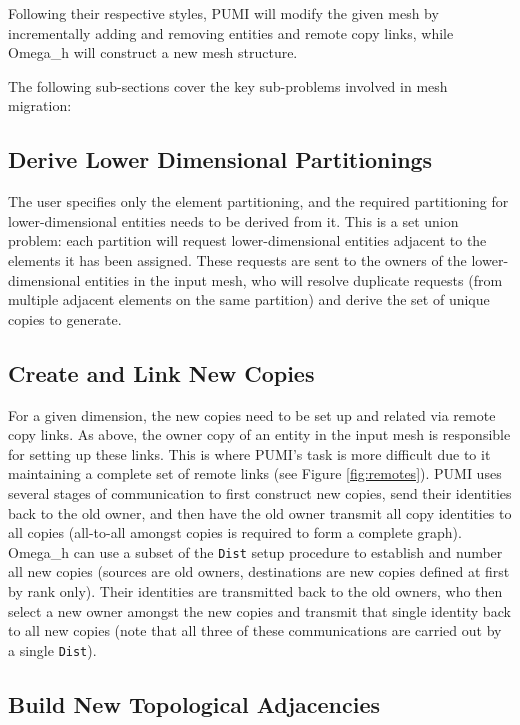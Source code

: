 Following their respective styles, PUMI will modify the given
mesh by incrementally adding and removing entities and remote
copy links,
while Omega\_h will construct a new mesh structure.

The following sub-sections cover the key sub-problems involved
in mesh migration:

\subsection{Derive Lower Dimensional Partitionings}
\label{sec:migr_down}

The user specifies only the element partitioning, and
the required partitioning for lower-dimensional entities needs to
be derived from it.
This is a set union problem: each partition will request lower-dimensional
entities adjacent to the elements it has been assigned.
These requests are sent to the owners of the lower-dimensional entities
in the input mesh, who will resolve duplicate requests (from multiple
adjacent elements on the same partition) and derive the set
of unique copies to generate.

\subsection{Create and Link New Copies}
\label{sec:migr_links}

For a given dimension, the new copies need to be set up
and related via remote copy links.
As above, the owner copy of an entity in the input mesh is responsible
for setting up these links.
This is where PUMI's task is more difficult due to it maintaining
a complete set of remote links (see Figure \ref{fig:remotes}).
PUMI uses several stages of communication to first construct
new copies, send their identities back to the old owner, and then
have the old owner transmit all copy identities to all copies (all-to-all
amongst copies is required to form a complete graph).
Omega\_h can use a subset of the \texttt{Dist} setup procedure
to establish and number all new copies (sources are old owners, destinations are
new copies defined at first by rank only).
Their identities are transmitted back to the old owners, who then
select a new owner amongst the new copies and transmit that single
identity back to all new copies (note that all three of these
communications are carried out by a single \texttt{Dist}).

\subsection{Build New Topological Adjacencies}
\label{sec:migr_topo}

